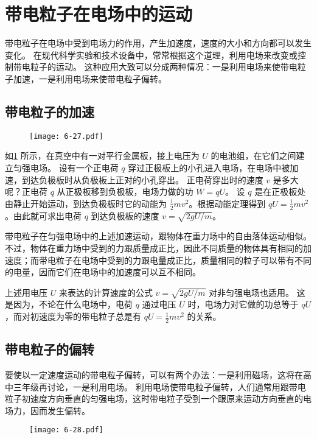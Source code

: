 \section{带电粒子在电场中的运动}

带电粒子在电场中受到电场力的作用，产生加速度，速度的大小和方向都可以发生变化。
在现代科学实验和技术设备中，常常根据这个道理，利用电场来改变或控制带电粒子的运动。
这种应用大致可以分成两种情况：一是利用电场来使带电粒子加速，一是利用电场来使带电粒子偏转。

\subsection{带电粒子的加速}
\begin{figure}
	\texttt{[image: 6-27.pdf]}
	\caption{}\label{fig:6-27}
\end{figure}

如\cref{fig:6-27} 所示，在真空中有一对平行金属板，接上电压为 $U$ 的电池组，在它们之间建立匀强电场。
设有一个正电荷 $q$ 穿过正极板上的小孔进入电场，在电场中被加速，到达负极板时从负极板上正对的小孔穿出。
正电荷穿出时的速度 $v$ 是多大呢？正电荷 $q$ 从正极板移到负极板，电场力做的功 $W=qU$。
设 $q$ 是在正极板处由静止开始运动，到达负极板时它的动能为 $\frac{1}{2}mv^2$。根据动能定理得到 $qU=\frac{1}{2}mv^2$。由此就可求出电荷 $q$ 到达负极板的速度 $v=\sqrt{2gU/m}$。

带电粒子在匀强电场中的上述加速运动，跟物体在重力场中的自由落体运动相似。
不过，物体在重力场中受到的力跟质量成正比，因此不同质量的物体具有相同的加速度；而带电粒子在电场中受到的力跟电量成正比，质量相同的粒子可以带有不同的电量，因而它们在电场中的加速度可以互不相同。

上述用电压 $U$ 来表达的计算速度的公式 $v=\sqrt{2gU/m}$ 对非匀强电场也适用。
这是因为，不论在什么电场中，电荷 $q$ 通过电压 $U$ 时，电场力对它做的功总等于 $qU$，而对初速度为零的带电粒子总是有 $qU=\frac{1}{2}mv^2$ 的关系。

\subsection{带电粒子的偏转}
要使以一定速度运动的带电粒子偏转，可以有两个办法：一是利用磁场，这将在高中三年级再讨论，一是利用电场。
利用电场使带电粒子偏转，人们通常用跟带电粒子初速度方向垂直的匀强电场，这时带电粒子受到一个跟原来运动方向垂直的电场力，因而发生偏转。
\begin{figure}
	\texttt{[image: 6-28.pdf]}
	\caption{}\label{fig:6-28}
\end{figure}

